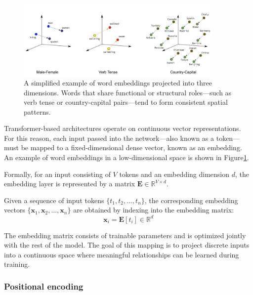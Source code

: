 \documentclass{pracalicmgr}
\begin{document}
\begin{figure}[h]
    \centering
    \includegraphics[width=0.9\textwidth]{src/word_embeddings_semantics.png}
    \caption{A simplified example of word embeddings projected into three dimensions. Words that share functional or structural roles—such as verb tense or country-capital pairs—tend to form consistent spatial patterns\cite{CloudxLabEmbeddings}.}
    \label{fig:embedding_example}
\end{figure}

Transformer-based architectures operate on continuous vector representations. For this reason, each input passed into the network—also known as a token—must be mapped to a fixed-dimensional dense vector, known as an embedding. An example of word embeddings in a low-dimensional space is shown in Figure\ref{fig:embedding_example}.

Formally, for an input consisting of \( V \) tokens and an embedding dimension \( d \), the embedding layer is represented by a matrix \( \mathbf{E} \in \mathbb{R}^{V \times d} \).

Given a sequence of input tokens \( \{t_1, t_2, \ldots, t_n\} \), the corresponding embedding vectors \( \{\mathbf{x}_1, \mathbf{x}_2, \ldots, \mathbf{x}_n\} \) are obtained by indexing into the embedding matrix:
\[
\mathbf{x}_i = \mathbf{E}[t_i] \in \mathbb{R}^d
\]

The embedding matrix consists of trainable parameters and is optimized jointly with the rest of the model. The goal of this mapping is to project discrete inputs into a continuous space where meaningful relationships can be learned during training.

\subsubsection{Positional encoding}
\end{document}
